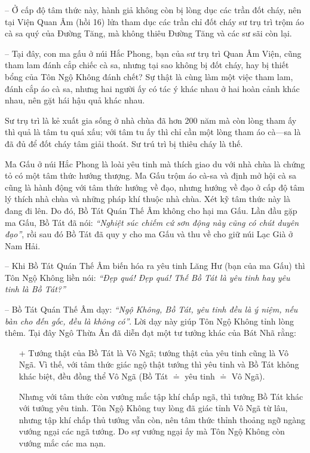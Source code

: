 -- Ở cấp độ tâm thức này, hành giả không còn bị lòng dục các trần đốt cháy, nên tại Viện Quan Âm (hồi 16) lửa tham dục các trần chỉ đốt cháy sư trụ trì trộm áo cà sa quý của Đường Tăng, mà không thiêu Đường Tăng và các sư sãi còn lại.

-- Tại đây, con ma gấu ở núi Hắc Phong, bạn của sư trụ trì Quan Âm Viện, cũng tham lam đánh cắp chiếc cà sa, nhưng tại sao không bị đốt cháy, hay bị thiết bổng của Tôn Ngộ Không đánh chết? Sự thật là cùng làm một việc tham lam, đánh cắp áo cà sa, nhưng hai người ấy có tác ý khác nhau ở hai hoàn cảnh khác nhau, nên gặt hái hậu quả khác nhau.

Sư trụ trì là kẻ xuất gia sống ở nhà chùa đã hơn 200 năm mà còn lòng tham ấy thì quả là tâm tu quá xấu; với tâm tu ấy thì chỉ cần một lòng tham áo cà---sa là đã đủ để đốt cháy tâm giải thoát. Sư trú trì bị thiêu cháy là thế.

Ma Gấu ở núi Hắc Phong là loài yêu tinh mà thích giao du với nhà chùa là chứng tỏ có một tâm thức hướng thượng. Ma Gấu trộm áo cà-sa và định mở hội cà sa cũng là hành động với tâm thức hướng về đạo, nhưng hướng về đạo ở cấp độ tâm lý thích nhà chùa và những pháp khí thuộc nhà chùa. Xét kỹ tâm thức này là đang đi lên. Do đó, Bồ Tát Quán Thế Âm không cho hại ma Gấu. Lần đầu gặp ma Gấu, Bồ Tát đã nói: \emph{``Nghiệt súc chiếm cứ sơn động này cũng có chút duyên đạo''}, rồi sau đó Bồ Tát đã quy y cho ma Gấu và thu về cho giữ núi Lạc Già ở Nam Hải.

-- Khi Bồ Tát Quán Thế Âm biến hóa ra yêu tinh Lăng Hư (bạn của ma Gấu) thì Tôn Ngộ Không liền nói: \emph{``Đẹp quá! Đẹp quá! Thế Bồ Tát là yêu tinh hay yêu tinh là Bồ Tát?''}

-- Bồ Tát Quán Thế Âm dạy: \emph{``Ngộ Không, Bồ Tát, yêu tinh đều là ý niệm, nếu bàn cho đến gốc, đều là không có''}. Lời dạy này giúp Tôn Ngộ Không tỉnh lòng thêm. Tại đây Ngô Thừa Ân đã diễn đạt một tư tưởng khác của Bát Nhã rằng:

\begin{enumerate}[label=\itshape\arabic*\upshape/]
    \item[+] Tướng thật của Bồ Tát là Vô Ngã; tướng thật của yêu tinh cũng là Vô Ngã. Vì thế, với tâm thức giác ngộ thật tướng thì yêu tinh và Bồ Tát không khác biệt, đều đồng thể Vô Ngã (Bồ Tát $\doteq$ yêu tinh $\doteq$ Vô Ngã).

    Nhưng với tâm thức còn vướng mắc tập khí chấp ngã, thì tướng Bồ Tát khác với tướng yêu tinh. Tôn Ngộ Không tuy lòng đã giác tỉnh Vô Ngã từ lâu, nhưng tập khí chấp thủ tướng vẫn còn, nên tâm thức thỉnh thoảng ngỡ ngàng vướng ngại các ngã tướng. Do sự vướng ngại ấy mà Tôn Ngộ Không còn vướng mắc các ma nạn.
\end{enumerate}

